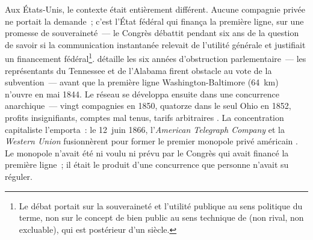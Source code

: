 %
Aux États-Unis, le contexte était entièrement différent. Aucune compagnie privée ne portait la demande~; c'est l'État fédéral qui finança la première ligne, sur une promesse de souveraineté~--- le Congrès débattit pendant six ans de la question de savoir si la communication instantanée relevait de l'utilité générale et justifiait un financement fédéral\footnote{Le débat portait sur la souveraineté et l'utilité publique au sens politique du terme, non sur le concept de \og bien public\fg{} au sens technique de \textcite{samuelson_pure_1954} (non rival, non excluable), qui est postérieur d'un siècle.}. \textcite{thompson_wiring_1947} détaille les six années d'obstruction parlementaire~--- les représentants du Tennessee et de l'Alabama firent obstacle au vote de la subvention~--- avant que la première ligne Washington-Baltimore (64~km) n'ouvre en mai 1844. Le réseau se développa ensuite dans une concurrence anarchique~--- vingt compagnies en 1850, quatorze dans le seul Ohio en 1852, profits insignifiants, comptes mal tenus, tarifs arbitraires \parencite{bertho_histoire_1984, nonnenmacher_telegraph_2001}. La concentration capitaliste l'emporta~: le 12~juin 1866, l'\emph{American Telegraph Company} et la \emph{Western Union} fusionnèrent pour former le premier monopole privé américain \parencite{thompson_wiring_1947, nonnenmacher_telegraph_2001}. Le monopole n'avait été ni voulu ni prévu par le Congrès qui avait financé la première ligne~; il était le produit d'une concurrence que personne n'avait su réguler.

